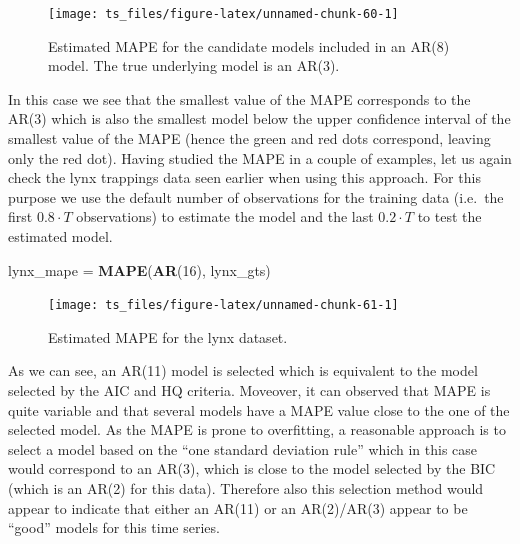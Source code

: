 \documentclass[]{book}
\newenvironment{Shaded}{\begin{snugshade}}{\end{snugshade}}
\newcommand{\KeywordTok}[1]{\textcolor[rgb]{0.13,0.29,0.53}{\textbf{#1}}}
\newcommand{\DecValTok}[1]{\textcolor[rgb]{0.00,0.00,0.81}{#1}}
\newcommand{\StringTok}[1]{\textcolor[rgb]{0.31,0.60,0.02}{#1}}
\newcommand{\NormalTok}[1]{#1}
\theoremstyle{definition}
\theoremstyle{definition}
\theoremstyle{definition}
\theoremstyle{remark}
\begin{document}
\begin{figure}

{\centering \texttt{[image: ts\_files/figure-latex/unnamed-chunk-60-1]} 

}

\caption{Estimated MAPE for the candidate models included in an AR(8) model. The true underlying model is an AR(3).}\label{fig:unnamed-chunk-60}
\end{figure}

In this case we see that the smallest value of the MAPE corresponds to
the AR(3) which is also the smallest model below the upper confidence
interval of the smallest value of the MAPE (hence the green and red dots
correspond, leaving only the red dot). Having studied the MAPE in a
couple of examples, let us again check the lynx trappings data seen
earlier when using this approach. For this purpose we use the default
number of observations for the training data (i.e.~the first
\(0.8 \cdot T\) observations) to estimate the model and the last
\(0.2 \cdot T\) to test the estimated model.

\begin{Shaded}
\begin{Highlighting}[]
\NormalTok{lynx_mape =}\StringTok{ }\KeywordTok{MAPE}\NormalTok{(}\KeywordTok{AR}\NormalTok{(}\DecValTok{16}\NormalTok{), lynx_gts)}
\end{Highlighting}
\end{Shaded}

\begin{figure}

{\centering \texttt{[image: ts\_files/figure-latex/unnamed-chunk-61-1]} 

}

\caption{Estimated MAPE for the lynx dataset.}\label{fig:unnamed-chunk-61}
\end{figure}

As we can see, an AR(11) model is selected which is equivalent to the
model selected by the AIC and HQ criteria. Moveover, it can observed
that MAPE is quite variable and that several models have a MAPE value
close to the one of the selected model. As the MAPE is prone to
overfitting, a reasonable approach is to select a model based on the
``one standard deviation rule'' which in this case would correspond to
an AR(3), which is close to the model selected by the BIC (which is an
AR(2) for this data). Therefore also this selection method would appear
to indicate that either an AR(11) or an AR(2)/AR(3) appear to be
``good'' models for this time series.
\end{document}
